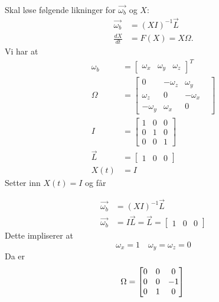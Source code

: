 Skal løse følgende likninger for $\vec{\omega_b}$ og $X:$
$$\begin{aligned}
\vec{\omega_b}&=(XI)^{-1}\vec{L}\\
\frac{dX}{dt}&=F(X)=X\Omega.
\end{aligned}$$
Vi har at 
$$\begin{aligned}
\omega_b&=\begin{bmatrix}\omega_x&\omega_y&\omega_z\end{bmatrix}^T\\
\Omega&=\begin{bmatrix}0&-\omega_z&\omega_y\\
\omega_z&0&-\omega_x\\
-\omega_y&\omega_x&0&\end{bmatrix}\\
I&=\begin{bmatrix}1&0&0\\0&1&0\\0&0&1\end{bmatrix}\\
\vec{L}&=\begin{bmatrix}1&0&0\end{bmatrix}\\
X(t)&=I
\end{aligned}$$
Setter inn $X(t)=I$ og får

$$\begin{aligned}
\vec{\omega_b}&=(XI)^{-1}\vec{L}\\
\vec{\omega_b}&= I \vec{L} = \vec{L} = \begin{bmatrix}1 & 0 & 0
\end{bmatrix}
\end{aligned}$$
Dette impliserer at
$$\omega_x=1\quad\omega_y=\omega_z=0$$
Da er 
$$\Omega=\begin{bmatrix}0&0&0\\
0&0&-1\\
0&1&0\end{bmatrix}\\$$
